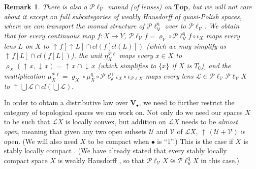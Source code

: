 \documentclass[preprint,12pt]{elsarticle}
\DeclareMathOperator{\upc}{\uparrow\!}
\DeclareMathOperator{\dc}{\downarrow\!}
\newcommand\Lform{\mathcal L}
\newcommand\Vt{\mathsf{V}}
\newcommand\quasi{\mathrm{q}} %
\newcommand\QL{\Plotkin^\quasi}
\newcommand\QLV{\QL_\Vt}
\newcommand\Plotkin{\mathcal P\ell} %
\newcommand\Plotkinn{\Plotkin_{\mathcal V}}
\newcommand\Val{{\mathbf V}}
\newcommand\Topcat{\mathbf{Top}}
\newtheorem{remark}[theorem]{Remark}
\begin{document}
\begin{remark}
  \label{rem:Plotkinn}
  There is also a $\Plotkinn$ monad (of lenses) on $\Topcat$, but we
  will not care about it except on full subcategories of weakly
  Hausdorff of quasi-Polish spaces, where we can transport the monad
  structure of $\QLV$ over to $\Plotkinn$.  We obtain that for every
  continuous map $f \colon X \to Y$,
  $\Plotkinn f = \varrho_Y \circ \QLV f \circ \iota_X$ maps every lens
  $L$ on $X$ to $\upc f [\upc L] \cap cl (f [cl (L)])$ (which we may
  simplify as $\upc f [L] \cap cl (f [L])$), the unit
  $\eta^{\Plotkin}_X$ maps every $x \in X$ to
  $\varrho_X (\upc x, \dc x) = \upc x \cap \dc x$ (which simplifies to
  $\{x\}$ if $X$ is $T_0$), and the multiplication
  $\mu^{\Plotkin}_X = \varrho_X \circ \mu^\quasi_X \circ \QLV
  {\iota_X} \circ \iota_{\Plotkin X}$ maps every lens
  $\mathcal L \in \Plotkinn {\Plotkinn X}$ to
  $\upc \bigcup \mathcal L \cap cl (\bigcup \mathcal L)$.
\end{remark}

In order to obtain a distributive law over $\Val_\bullet$, we need to
further restrict the category of topological spaces we can work on.
Not only do we need our spaces $X$ to be such that $\Lform X$ is
locally convex, but addition on $\Lform X$ needs to be \emph{almost
  open}, meaning that given any two open subsets $\mathcal U$ and
$\mathcal V$ of $\Lform X$, $\upc (\mathcal U + \mathcal V)$ is open.
(We will also need $X$ to be compact when $\bullet$ is ``$1$''.)  This
is the case if $X$ is stably locally compact \cite[Lemma
3.24]{JGL-mscs16}.  (We have already stated that every stably locally
compact space $X$ is weakly Hausdorff \cite[Lemma~8.1]{KL:measureext},
so that $\Plotkinn X \cong \QLV X$ in this case.)
\end{document}
